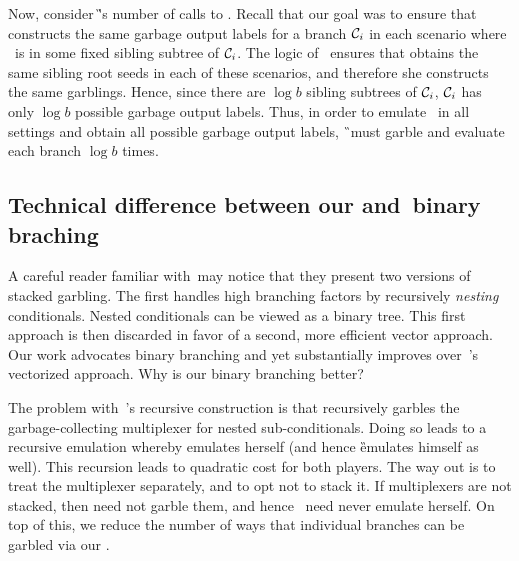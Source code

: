 Now, consider \G's number of calls to \Ev.  Recall that our
goal was to ensure that \E constructs the same garbage output labels
for a branch $\mathcal C_i$ in each scenario where \aid\ is in some fixed
sibling subtree of $\mathcal C_i$. The logic of \gadget\ ensures
that \E obtains the same sibling root seeds in each of these
scenarios, and therefore she constructs the same garblings. Hence,
since there are $\log b$ sibling subtrees of $\mathcal C_i$, $\mathcal C_i$ has
only $\log b$ possible garbage output labels.
Thus, in order to emulate \E\ in all settings and obtain all possible
garbage output labels, \G\ must garble and evaluate each branch $\log b$ times.


\subsection{Technical difference between our and~\HK binary braching}
\label{sec:techOverviewDiff}

A careful reader familiar with~\HK may notice that they present two
versions of stacked garbling.
The first handles high branching factors by recursively \emph{nesting}
conditionals.
Nested conditionals can be viewed as a binary
tree.
This first approach is then discarded in favor of a second, more efficient vector approach.
Our work advocates binary branching and yet substantially improves
over~\HK's vectorized approach.
Why is our binary branching better?

The problem with~\HK's recursive construction
is that \E recursively garbles the garbage-collecting multiplexer for
nested sub-conditionals.
Doing so leads to a recursive emulation whereby \E
emulates herself (and hence \G emulates himself as well).
This recursion leads to quadratic cost for both players.
The way out is to treat the multiplexer separately, and to opt not
to stack it.
If multiplexers are not stacked, then \E need not garble them, and
hence \E\ need never emulate herself.
On top of this, we reduce the number of ways that individual branches
can be garbled via our \gadget.

